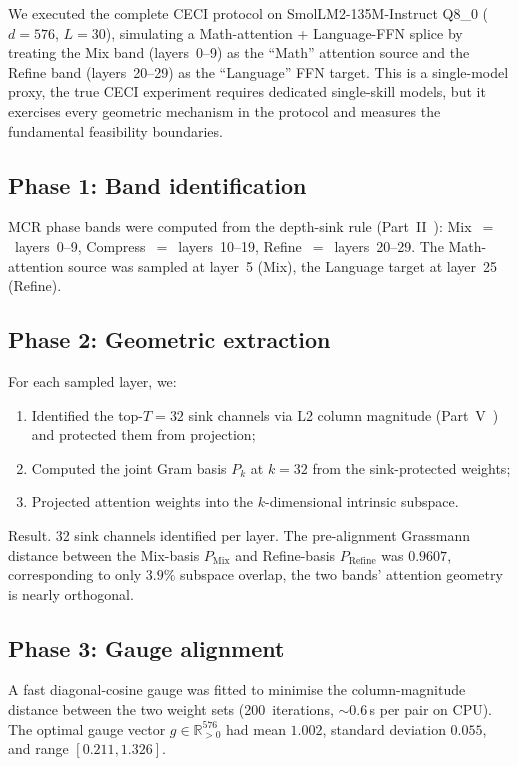 \documentclass[11pt]{article}
\begin{document}
We executed the complete CECI protocol on SmolLM2-135M-Instruct Q8\_0
($d{=}576$, $L{=}30$), simulating a Math-attention + Language-FFN
splice by treating the Mix band (layers~0--9) as the ``Math'' attention
source and the Refine band (layers~20--29) as the ``Language'' FFN
target. This is a single-model proxy, the true CECI experiment
requires dedicated single-skill models, but it exercises every
geometric mechanism in the protocol and measures the fundamental
feasibility boundaries.

\subsection{Phase 1: Band identification}

MCR phase bands were computed from the depth-sink rule
(Part~II~\cite{stewart2026gp}): Mix~$=$~layers~0--9,
Compress~$=$~layers~10--19, Refine~$=$~layers~20--29. The
Math-attention source was sampled at layer~5 (Mix), the Language
target at layer~25 (Refine).

\subsection{Phase 2: Geometric extraction}

For each sampled layer, we:
\begin{enumerate}
\item Identified the top-$T{=}32$ sink channels via L2 column
 magnitude (Part~V~\cite{stewart2026distill}) and protected
 them from projection;
\item Computed the joint Gram basis $P_k$ at $k{=}32$ from the
 sink-protected weights;
\item Projected attention weights into the $k$-dimensional intrinsic
 subspace.
\end{enumerate}

Result. 32 sink channels identified per layer. The
pre-alignment Grassmann distance between the Mix-basis $P_{\mathrm{Mix}}$
and Refine-basis $P_{\mathrm{Refine}}$ was $0.9607$,
corresponding to only $3.9\%$ subspace overlap, the two bands'
attention geometry is nearly orthogonal.

\subsection{Phase 3: Gauge alignment}

A fast diagonal-cosine gauge was fitted to minimise the column-magnitude
distance between the two weight sets (200~iterations, ${\sim}0.6$\,s per
pair on CPU). The optimal gauge vector $g\in\mathbb{R}^{576}_{>0}$ had
mean $1.002$, standard deviation $0.055$, and range $[0.211, 1.326]$.
\end{document}
